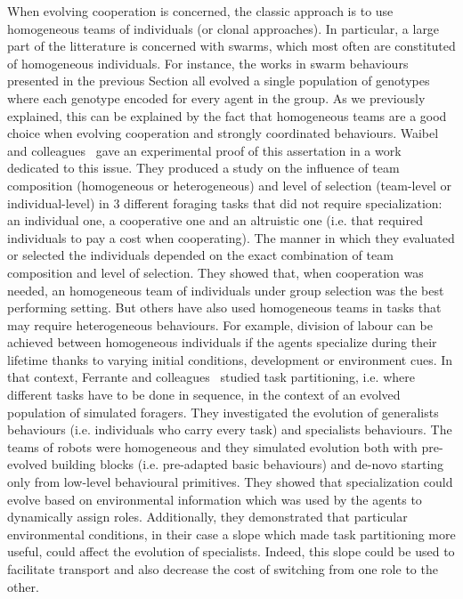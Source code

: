     When evolving cooperation is concerned, the classic approach is to use homogeneous teams of individuals (or clonal approaches). In particular, a large part of the litterature is concerned with swarms, which most often are constituted of homogeneous individuals. For instance, the works in swarm behaviours presented in the previous Section all evolved a single population of genotypes where each genotype encoded for every agent in the group. As we previously explained, this can be explained by the fact that homogeneous teams are a good choice when evolving cooperation and strongly coordinated behaviours. Waibel and colleagues~\parencite{Waibel2009} gave an experimental proof of this assertation in a work dedicated to this issue. They produced a study on the influence of team composition (homogeneous or heterogeneous) and level of selection (team-level or individual-level) in $3$ different foraging tasks that did not require specialization: an individual one, a cooperative one and an altruistic one (i.e. that required individuals to pay a cost when cooperating). The manner in which they evaluated or selected the individuals depended on the exact combination of team composition and level of selection. They showed that, when cooperation was needed, an homogeneous team of individuals under group selection was the best performing setting. But others have also used homogeneous teams in tasks that may require heterogeneous behaviours. For example, division of labour can be achieved between homogeneous individuals if the agents specialize during their lifetime thanks to varying initial conditions, development or environment cues. In that context, Ferrante and colleagues~\parencite{Ferrante2015} studied task partitioning, i.e. where different tasks have to be done in sequence, in the context of an evolved population of simulated foragers. They investigated the evolution of generalists behaviours (i.e. individuals who carry every task) and specialists behaviours. The teams of robots were homogeneous and they simulated evolution both with pre-evolved building blocks (i.e. pre-adapted basic behaviours) and de-novo starting only from low-level behavioural primitives. They showed that specialization could evolve based on environmental information which was used by the agents to dynamically assign roles. Additionally, they demonstrated that particular environmental conditions, in their case a slope which made task partitioning more useful, could affect the evolution of specialists. Indeed, this slope could be used to facilitate transport and also decrease the cost of switching from one role to the other.

